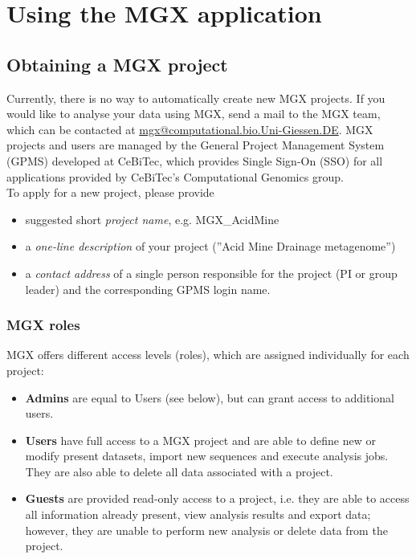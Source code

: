 
\chapter{Using the MGX application}
\label{using}


\section{Obtaining a MGX project}

Currently, there is no way to automatically create new MGX projects. If you would like to
analyse your data using MGX, send a mail to the MGX team, which can be contacted at 
\href{mailto:mgx@computational.bio.Uni-Giessen.DE}{mgx@computational.bio.Uni-Giessen.DE}. MGX projects
and users are managed by the General Project Management System (GPMS) developed at CeBiTec,
which provides Single Sign-On (SSO) for all applications provided by CeBiTec's Computational
Genomics group.\\

To apply for a new project, please provide

\begin{itemize}
  \item suggested short \textit{project name}, e.g. MGX\_AcidMine
  \item a \textit{one-line description} of your project (''Acid Mine Drainage metagenome'')
  \item a \textit{contact address} of a single person responsible for the project (PI or group leader)
and the corresponding GPMS login name.
\end{itemize}


\subsection{MGX roles}

MGX offers different access levels (roles), which are assigned individually for each
project: \\

\begin{itemize}
  \item{\textbf{Admins} are equal to Users (see below), but can grant access to additional users.}
  \item \textbf{Users} have full access to a MGX project and are able to define new or modify
present datasets, import new sequences and execute analysis jobs. They are also able to
delete all data associated with a project.
  \item \textbf{Guests} are provided read-only access to a project, i.e. they are able to access
all information already present, view analysis results and export data; however, they are
unable to perform new analysis or delete data from the project.
\end{itemize}

